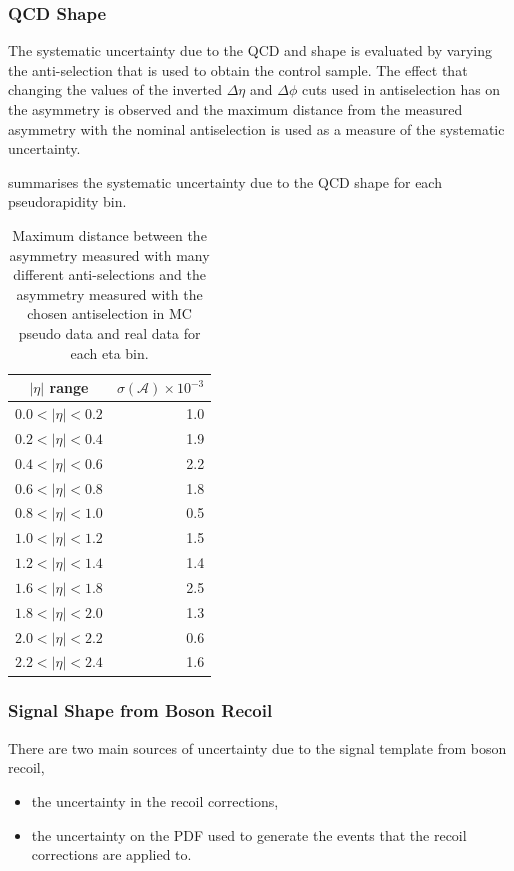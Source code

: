\subsubsection{QCD \ETm Shape}
The systematic uncertainty due to the {QCD} and \gjet \ETm shape is evaluated
by varying the anti-selection that is used to obtain the control sample. The
effect that changing the values of the inverted $\Delta\eta$ and $\Delta\phi$
cuts used in antiselection has on the asymmetry is observed and the maximum
distance from the measured asymmetry with the nominal antiselection is used as a
measure of the systematic uncertainty.

 summarises the systematic uncertainty due to the
{QCD} \ETm shape for each pseudorapidity bin.

\begin{table}[htbp]
\begin{center}
\begin{tabular}{cr}
\toprule
$|\eta|$ range  & $\sigma(\mathcal{A}) \times 10^{-3}$\\
\midrule
$0.0<|\eta|<0.2$ & 1.0\\
$0.2<|\eta|<0.4$ & 1.9\\
$0.4<|\eta|<0.6$ & 2.2\\
$0.6<|\eta|<0.8$ & 1.8\\
$0.8<|\eta|<1.0$ & 0.5\\
$1.0<|\eta|<1.2$ & 1.5\\
$1.2<|\eta|<1.4$ & 1.4\\
$1.6<|\eta|<1.8$ & 2.5\\
$1.8<|\eta|<2.0$ & 1.3\\
$2.0<|\eta|<2.2$ & 0.6\\
$2.2<|\eta|<2.4$ & 1.6\\
\bottomrule
\end{tabular}
\caption{Maximum distance between the asymmetry measured with many different anti-selections
and the asymmetry measured with the chosen antiselection in MC pseudo data and real data for each eta bin.}
\label{tab:updatedsystQCD}
\end{center}
\end{table}

\subsubsection{Signal \ETm Shape from Boson Recoil}

There are two main sources of uncertainty due to the signal template from
boson recoil,
\begin{itemize}
    \item the uncertainty in the recoil corrections,
    \item the uncertainty on the {PDF} used to generate the events that the
recoil corrections are applied to.
\end{itemize}

